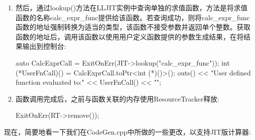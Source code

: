 \begin{enumerate}
\item
然后，通过lookup()方法在LLJIT实例中查询单独的求值函数，方法是将求值函数的名称calc\_expr\_func提供给该函数。若查询成功，则将calc\_expr\_func函数的地址强制转换为适当的类型，该函数不接受参数并返回单个整数。获取函数的地址后，调用该函数以使用用户定义函数提供的参数生成结果，在将结果输出到控制台:

\begin{cpp}
        auto CalcExprCall = ExitOnErr(JIT->lookup("calc_expr_func"));
        int (*UserFnCall)() = CalcExprCall.toPtr<int (*)()>();
        outs() << "User defined function evaluated to:" << UserFnCall() << "\n";
\end{cpp}

\item
函数调用完成后，之前与函数关联的内存使用ResourceTracker释放:

\begin{cpp}
ExitOnErr(RT->remove());
\end{cpp}
\end{enumerate}



现在，简要地看一下我们在CodeGen.cpp中所做的一些更改，以支持JIT版计算器:

